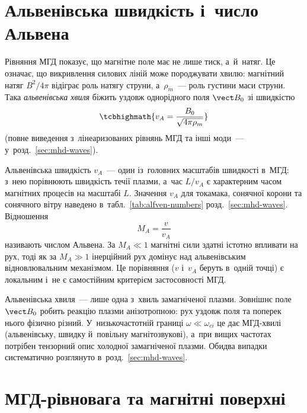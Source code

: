 \section{Альвенівська швидкість і~число Альвена}


Рівняння МГД показує, що магнітне поле має не лише тиск, а~й~натяг. Це означає, що
викривлення силових ліній може породжувати хвилю: магнітний натяг $B^2/4\pi$ відіграє
роль натягу струни, а~$\rho_m$~--- роль густини маси струни. Така \emph{альвенівська хвиля}
біжить уздовж однорідного поля $\vect B_0$ зі швидкістю
\begin{equation}\label{eq:alfven-wave}
    \tcbhighmath{v_A=\frac{B_0}{\sqrt{4\pi\rho_m}}}
\end{equation}
(повне виведення з~лінеаризованих рівнянь МГД та інші моди~--- у~розд.~\ref{sec:mhd-waves}).

Альвенівська швидкість $v_A$~--- один із~головних масштабів швидкості в~МГД: з~нею порівнюють
швидкість течії плазми, а~час $L/v_A$ є характерним часом магнітних процесів на масштабі $L$.
Значення $v_A$ для токамака, сонячної корони та сонячного вітру наведено в~табл.~\ref{tab:alfven-numbers} розд.~\ref{sec:mhd-waves}.
Відношення
\begin{equation*}
M_A=\frac{v}{v_A}
\end{equation*}
називають числом Альвена. За $M_A\ll1$ магнітні сили здатні істотно впливати на рух, тоді
як за $M_A\gg1$ інерційний рух домінує над альвенівським відновлювальним механізмом. Це
порівняння ($v$ і~$v_A$ беруть в~одній точці) є локальним і~не є самостійним критерієм застосовності МГД.

Альвенівська хвиля~--- лише одна з~хвиль замагніченої плазми. Зовнішнє поле $\vect B_0$ робить
реакцію плазми анізотропною: рух уздовж поля та поперек
нього фізично різний. У~низькочастотній границі $\omega\ll\omega_{ci}$ це дає МГД-хвилі
(альвенівську, швидку й~повільну магнітозвукові), а~при вищих частотах потрібен тензорний
опис холодної замагніченої плазми.
Обидва випадки систематично розглянуто в~розд.~\ref{sec:mhd-waves}.


\section{МГД-рівновага та магнітні поверхні}\label{sec:mhd-equilibrium}



